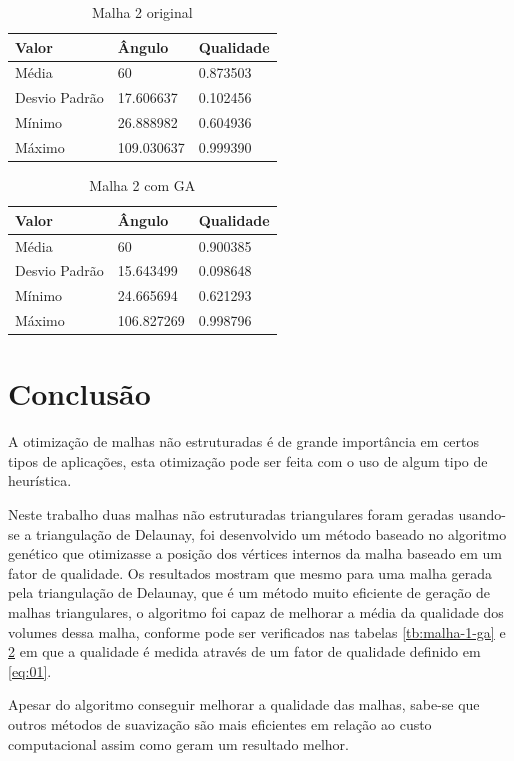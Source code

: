 \documentclass[review]{elsarticle}
\begin{document}
\begin{table}[]
\caption{Malha 2 original}
\centering
\begin{tabular}{lll}
\toprule
Valor & Ângulo & Qualidade \\
\midrule
Média & 60 & 0.873503 \\
Desvio Padrão & 17.606637 & 0.102456 \\
Mínimo & 26.888982 & 0.604936 \\
Máximo & 109.030637 &0.999390
\end{tabular}
\label{tb:malha-2-original}
\end{table}

\begin{table}[]
\caption{Malha 2 com GA}
\centering
\begin{tabular}{lll}
\toprule
Valor & Ângulo & Qualidade \\
\midrule
Média & 60 & 0.900385 \\
Desvio Padrão & 15.643499 & 0.098648 \\
Mínimo & 24.665694 & 0.621293 \\
Máximo & 106.827269 & 0.998796
\end{tabular}
\label{tb:malha-2-ga}
\end{table}

\section*{Conclusão}
A otimização de malhas não estruturadas é de grande importância em certos tipos de aplicações, esta otimização pode ser feita com o uso de algum tipo de heurística.

Neste trabalho duas malhas não estruturadas triangulares foram geradas usando-se a triangulação de Delaunay, foi desenvolvido um método baseado no algoritmo genético que otimizasse a posição dos vértices internos da malha baseado em um fator de qualidade. Os resultados mostram que mesmo para uma malha gerada pela triangulação de Delaunay, que é um método muito eficiente de geração de malhas triangulares, o algoritmo foi capaz de melhorar a média da qualidade dos volumes dessa malha, conforme pode ser verificados nas tabelas \ref{tb:malha-1-ga} e \ref{tb:malha-2-ga} em que a qualidade é medida através de um fator de qualidade definido em \ref{eq:01}.

Apesar do algoritmo conseguir melhorar a qualidade das malhas, sabe-se que outros métodos de suavização são mais eficientes em relação ao custo computacional assim como geram um resultado melhor.



\end{document}
